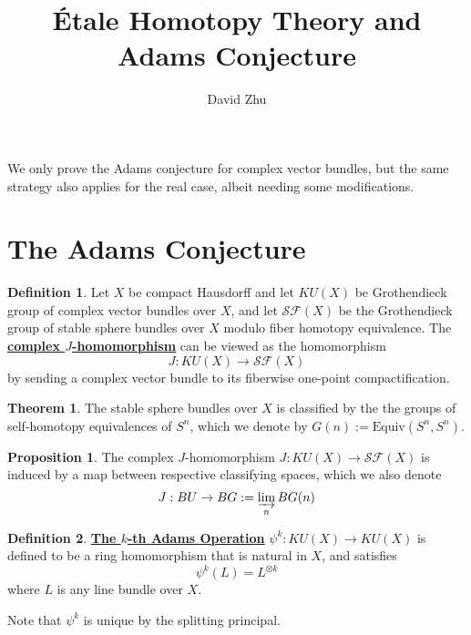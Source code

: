 \documentclass{article}
\title{\'Etale Homotopy Theory and Adams Conjecture}
\author{David Zhu}
\theoremstyle{definition}
\newtheorem{theorem}{Theorem}[section]
\theoremstyle{definition}
\newtheorem{definition}{Definition}[theorem]
\theoremstyle{definition}
\theoremstyle{definition}
\newtheorem{proposition}{Proposition}[theorem]
\theoremstyle{definition}
\theoremstyle{definition}
\theoremstyle{definition}
\begin{document}
\maketitle

We only prove the Adams conjecture for complex vector bundles, but the same strategy also applies for the real case, albeit needing some modifications. 

\section{The Adams Conjecture}
\begin{tcolorbox}[colback=purple!5!white,colframe=purple!75!black]
	\begin{definition}
	Let $X$ be compact Hausdorff and let $KU(X)$ be Grothendieck group of complex vector bundles over $X$, and let $\mathcal{SF}(X)$ be the Grothendieck group of stable sphere bundles over $X$ modulo fiber homotopy equivalence. The \underline{\textbf{complex $J$-homomorphism}} can be viewed as the homomorphism
	\[J: KU(X)\to \mathcal{SF}(X)\]
	by sending a complex vector bundle to its fiberwise one-point compactification. 
	\end{definition}
	\end{tcolorbox}

	
	\begin{tcolorbox}[colback=red!5!white,colframe=red!30!white]
		\begin{theorem}
		The stable sphere bundles over $X$ is classified by the the groups of self-homotopy equivalences of $S^n$, which we denote by $G(n):=\textrm{Equiv}(S^n,S^n)$. 
		\end{theorem}
		\end{tcolorbox}
		

	\begin{tcolorbox}[colback=blue!5!white,colframe=blue!30!white]
		\begin{proposition}
		The complex $J$-homomorphism $J: KU(X)\to \mathcal{SF}(X)$ is induced by a map between respective classifying spaces, which we also denote 
		\[J: BU\to BG:=\varinjlim_{n} BG(n)\]
		\end{proposition}
		\end{tcolorbox}


	
	
	
	
	\begin{tcolorbox}[colback=purple!5!white,colframe=purple!75!black]
	\begin{definition}
	\underline{\textbf{The $k$-th Adams Operation}} $\psi^k: KU(X)\to KU(X)$ is defined to be a ring homomorphism that is natural in $X$, and satisfies 
	\[\psi^k(L)=L^{\otimes k}\]
	where $L$ is any line bundle over $X$. 	
	\end{definition}
	\end{tcolorbox}
	Note that $\psi^k$ is unique by the splitting principal. 
	
\end{document}

